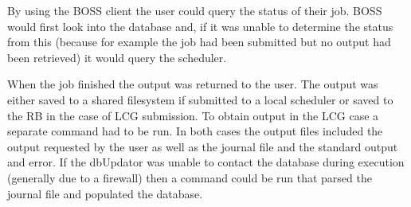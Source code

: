 By using the BOSS client the user could query the status of their job. BOSS would first look into the database and, if it was unable to determine the status from this (because for example the job had been submitted but no output had been retrieved) it would query the scheduler.  

When the job finished the output was returned to the user. The output was either saved to a shared filesystem if submitted to a local scheduler or saved to the RB in the case of LCG submission. To obtain output in the LCG case a separate command had to be run. In both cases the output files included the output requested by the user as well as the journal file and the standard output and error. If the dbUpdator was unable to contact the database during execution (generally due to a firewall) then a command could be run that parsed the journal file and populated the database.





